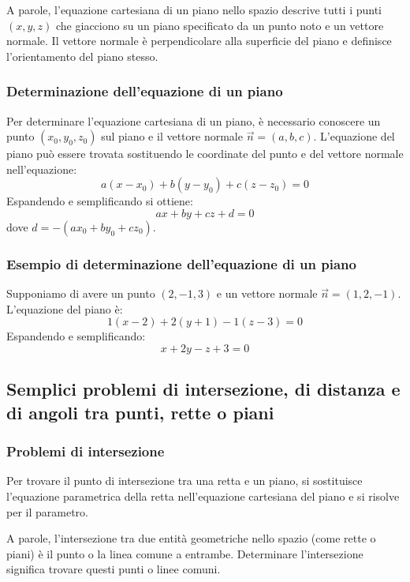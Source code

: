 \documentclass{article}
\begin{document}
A parole, l'equazione cartesiana di un piano nello spazio descrive tutti i punti
\((x, y, z)\) che giacciono su un piano specificato da un punto noto e un vettore normale.
Il vettore normale è perpendicolare alla superficie del piano e definisce l'orientamento del
piano stesso.

\subsubsection{Determinazione dell'equazione di un piano}
Per determinare l'equazione cartesiana di un piano, è necessario conoscere un punto
\((x_0, y_0, z_0)\) sul piano e il vettore normale \(\vec{n} = (a, b, c)\).
L'equazione del piano può essere trovata sostituendo le coordinate del punto e del vettore
normale nell'equazione:
\[
    a(x - x_0) + b(y - y_0) + c(z - z_0) = 0
\]
Espandendo e semplificando si ottiene:
\[
    ax + by + cz + d = 0
\]
dove \(d = -(ax_0 + by_0 + cz_0)\).

\subsubsection{Esempio di determinazione dell'equazione di un piano}
Supponiamo di avere un punto \((2, -1, 3)\) e un vettore normale \(\vec{n} = (1, 2, -1)\). L'equazione del piano è:
\[
    1(x - 2) + 2(y + 1) - 1(z - 3) = 0
\]
Espandendo e semplificando:
\[
    x + 2y - z + 3 = 0
\]

\newpage
\subsection{Semplici problemi di intersezione, di distanza e di angoli tra punti, rette o piani}

\subsubsection{Problemi di intersezione}
Per trovare il punto di intersezione tra una retta e un piano, si sostituisce l'equazione
parametrica della retta nell'equazione cartesiana del piano e si risolve per il parametro.

A parole, l'intersezione tra due entità geometriche nello spazio (come rette o piani) è il
punto o la linea comune a entrambe. Determinare l'intersezione significa trovare questi punti
o linee comuni.
\end{document}
